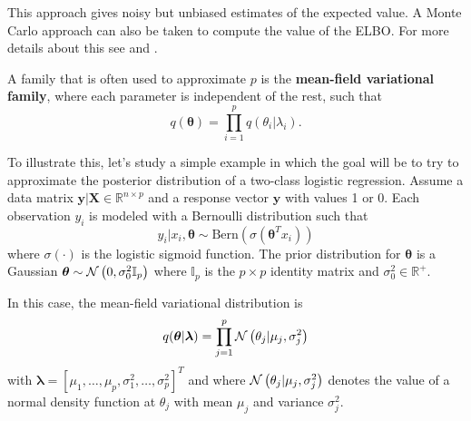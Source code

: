 This approach gives noisy but unbiased estimates of the expected value. A Monte Carlo approach can also be taken to compute the value of the ELBO. For more details about this see \cite{kucukelbir2017automatic} and \cite{ranganath2014black}.

A family that is often used to approximate $p$ is the \textbf{mean-field variational family}, where each parameter is independent of the rest, such that
\begin{equation}
  q(\boldsymbol{\theta}) = \prod_{i = 1}^p q(\theta_i | \lambda_i).
\end{equation}

To illustrate this, let's study a simple example in which the goal will be to try to approximate the posterior distribution of a two-class logistic regression. Assume a data matrix $\boldsymbol{y} | \boldsymbol{X} \in \mathbb{R}^{n \times p}$ and a response vector $\boldsymbol{y}$ with values 1 or 0. Each observation $y_i$ is modeled with a Bernoulli distribution such that
\begin{equation}
  y_i | x_i, \boldsymbol{\theta} \sim \mathrm{Bern}(\sigma(\boldsymbol{\theta}^T x_i))
\end{equation}
where $\sigma(\cdot)$ is the logistic sigmoid function. The prior distribution for $\boldsymbol{\theta}$ is a Gaussian $\boldsymbol{\theta} \sim \mathcal{N}\left( 0, \sigma_0^2 \mathbb{I}_p \right)$ where $\mathbb{I}_p$ is the $p \times p$ identity matrix and $\sigma_0^2 \in \mathbb{R}^+$.

In this case, the mean-field variational distribution is
\begin{equation}
  \label{eq:mean_field_normal_prior}
  q(\boldsymbol{\theta} | \boldsymbol{\lambda}) = \prod_{j = 1}^p \mathcal{N}\left( \theta_j | \mu_j, \sigma_j^2 \right)
 \end{equation}
with $\boldsymbol{\lambda} = \left[ \mu_1, \hdots, \mu_p, \sigma_1^2, \hdots, \sigma_p^2 \right]^T$ and where $\mathcal{N}\left( \theta_j | \mu_j, \sigma_j^2 \right)$ denotes the value of a normal density function at $\theta_j$ with mean $\mu_j$ and variance $\sigma_j^2$.


